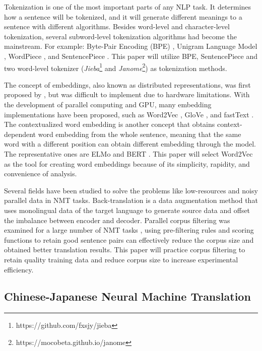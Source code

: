 Tokenization is one of the most important parts of any NLP task. It determines how a sentence will be tokenized, and it will generate different meanings to a sentence with different algorithms. Besides word-level and character-level tokenization, several subword-level tokenization algorithms had become the mainstream. For example: Byte-Pair Encoding (BPE) \cite{sennrich_neural_2016}, Unigram Language Model \cite{kudo-2018-subword}, WordPiece \cite{6289079}, and SentencePiece \cite{kudo-richardson-2018-sentencepiece}. This paper will utilize BPE, SentencePiece \cite{sennrich_neural_2016, kudo-richardson-2018-sentencepiece} and two word-level tokenizer (\textit{Jieba}\footnote{https://github.com/fxsjy/jieba} and \textit{Janome}\footnote{https://mocobeta.github.io/janome}) as tokenization methods.

The concept of embeddings, also known as distributed representations, was first proposed by \cite{hinton1986learning, bengio2003neural}, but was difficult to implement due to hardware limitations. With the development of parallel computing and GPU, many embedding implementations have been proposed, such as Word2Vec \cite{mikolov2013efficient}, GloVe \cite{pennington2014glove}, and fastText \cite{bojanowski2017enriching}. The contextualized word embedding is another concept that obtains context-dependent word embedding from the whole sentence, meaning that the same word with a different position can obtain different embedding through the model. The representative ones are ELMo \cite{peters-etal-2018-deep} and BERT \cite{devlin-etal-2019-bert}. This paper will select Word2Vec \cite{mikolov2013efficient} as the tool for creating word embeddings because of its simplicity, rapidity, and convenience of analysis.

Several fields have been studied to solve the problems like low-resources and noisy parallel data in NMT tasks. Back-translation \cite{sennrich-etal-2016-improving} is a data augmentation method that uses monolingual data of the target language to generate source data and offset the imbalance between encoder and decoder. Parallel corpus filtering was examined for a large number of NMT tasks \cite{koehn2018findings}, using pre-filtering rules and scoring functions to retain good sentence pairs can effectively reduce the corpus size and obtained better translation results. This paper will practice corpus filtering to retain quality training data and reduce corpus size to increase experimental efficiency.

\subsection{Chinese-Japanese Neural Machine Translation}

